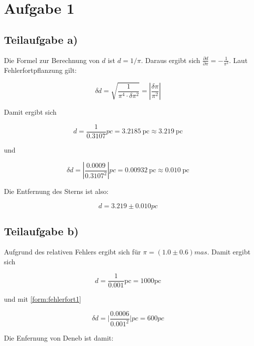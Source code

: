 \documentclass[titlepage]{scrartcl}
\begin{document}
\section{Aufgabe 1}
\subsection{Teilaufgabe a)}

Die Formel zur Berechnung von $ d $ ist $ d = 1/ \pi $. Daraus ergibt sich $ \frac{\partial d}{\partial \pi} = - \frac{1}{\pi^2} $. Laut Fehlerfortpflanzung gilt:

\begin{equation}
\delta d = \sqrt{\frac{1}{\pi^4 \cdot \delta \pi^2}} = \left| \frac{\delta \pi}{\pi^2} \right|
\label{form:fehlerfort1}
\end{equation}

Damit ergibt sich

\begin{equation}
d = \frac{1}{0.3107} pc = 3.2185\ \mathrm{pc} \approx 3.219 \ \mathrm{pc}
\end{equation}

und

\begin{equation}
\delta d = \left| \frac{0.0009}{0.3107^2} \right| pc = 0.00932 \ \mathrm{pc} \approx 0.010\ \mathrm{pc}
\end{equation}

Die Entfernung des Sterns ist also:

\begin{equation}
d = 3.219 \pm 0.010  pc
\end{equation}

\subsection{Teilaufgabe b)}
Aufgrund des relativen Fehlers ergibt sich für $ \pi = (1.0 \pm 0.6) mas $. Damit ergibt sich

\begin{equation}
d = \frac{1}{0.001} \mathrm{pc} = 1000 \mathrm{pc}
\end{equation}

und mit \eqref{form:fehlerfort1}

\begin{equation}
\delta d = \vert \frac{0.0006}{0.001^2} \vert pc = 600 pc
\end{equation}

Die Enfernung von Deneb ist damit:
\end{document}
